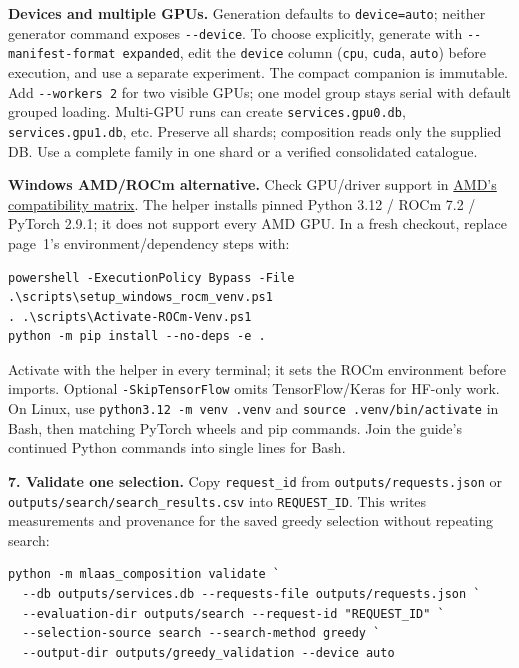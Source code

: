 \documentclass[10pt,a4paper]{article}
\newcommand{\code}[1]{\nolinkurl{#1}}
\newcommand{\lead}[1]{\par\smallskip\noindent\textbf{#1}\enspace}
\begin{document}
\lead{Devices and multiple GPUs.} Generation defaults to \code{device=auto}; neither generator command exposes \code{--device}. To choose explicitly, generate with \code{--manifest-format expanded}, edit the \code{device} column (\code{cpu}, \code{cuda}, \code{auto}) before execution, and use a separate experiment. The compact companion is immutable. Add \code{--workers 2} for two visible GPUs; one model group stays serial with default grouped loading. Multi-GPU runs can create \code{services.gpu0.db}, \code{services.gpu1.db}, etc. Preserve all shards; composition reads only the supplied DB. Use a complete family in one shard or a verified consolidated catalogue.

\lead{Windows AMD/ROCm alternative.} Check GPU/driver support in \href{https://rocm.docs.amd.com/projects/radeon-ryzen/en/latest/docs/compatibility/compatibilityrad/windows/windows_compatibility.html}{AMD's compatibility matrix}. The helper installs pinned Python 3.12 / ROCm 7.2 / PyTorch 2.9.1; it does not support every AMD GPU. In a fresh checkout, replace page~1's environment/dependency steps with:
\begin{lstlisting}
powershell -ExecutionPolicy Bypass -File .\scripts\setup_windows_rocm_venv.ps1
. .\scripts\Activate-ROCm-Venv.ps1
python -m pip install --no-deps -e .
\end{lstlisting}
Activate with the helper in every terminal; it sets the ROCm environment before imports. Optional \code{-SkipTensorFlow} omits TensorFlow/Keras for HF-only work. On Linux, use \code{python3.12 -m venv .venv} and \code{source .venv/bin/activate} in Bash, then matching PyTorch wheels and pip commands. Join the guide's continued Python commands into single lines for Bash.

\lead{7. Validate one selection.} Copy \code{request_id} from \code{outputs/requests.json} or \code{outputs/search/search_results.csv} into \code{REQUEST_ID}. This writes measurements and provenance for the saved greedy selection without repeating search:
\begin{lstlisting}
python -m mlaas_composition validate `
  --db outputs/services.db --requests-file outputs/requests.json `
  --evaluation-dir outputs/search --request-id "REQUEST_ID" `
  --selection-source search --search-method greedy `
  --output-dir outputs/greedy_validation --device auto
\end{lstlisting}
\end{document}
